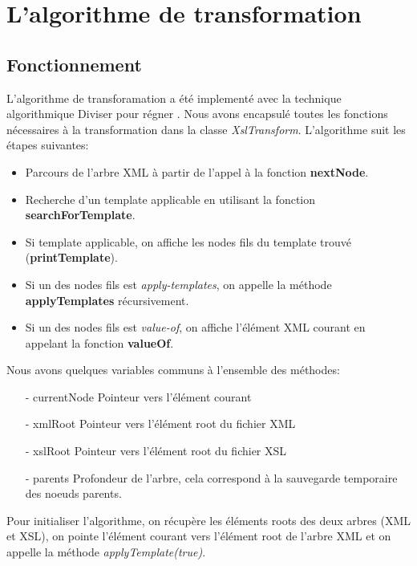 \section{L'algorithme de transformation}
	\subsection {Fonctionnement}
	L'algorithme de transforamation a été implementé avec la 
	technique algorithmique \og Diviser pour régner \fg. Nous avons
	encapsulé toutes les fonctions nécessaires à la transformation 
	dans la classe \textit {XslTransform}. 
	L'algorithme suit les étapes suivantes: \\

	\begin{itemize}
	\item Parcours de l'arbre XML à partir de l'appel à la fonction 
		\textbf{nextNode}.
	\item Recherche d'un template applicable en utilisant la fonction 
		\textbf{searchForTemplate}.
	\item Si template applicable, on affiche les nodes fils du 
		template trouvé (\textbf{printTemplate}).
	\item Si un des nodes fils est \textit{apply-templates}, on
		appelle la méthode \textbf{applyTemplates} récursivement.
	\item Si un des nodes fils est \textit{value-of}, on
		affiche l'élément XML courant en appelant la fonction
		\textbf{valueOf}. \\
	\end{itemize}	
	
	Nous avons quelques variables communs à l'ensemble des méthodes:
	
	\begin{itemize}
		\item[- currentNode] Pointeur vers l'élément courant
		\item[- xmlRoot] Pointeur vers l'élément root du fichier XML
		\item[- xslRoot] Pointeur vers l'élément root du fichier XSL
		\item[- parents] Profondeur de l'arbre, cela
		correspond à la sauvegarde temporaire des noeuds parents. \\
	\end{itemize}
	
	
	Pour initialiser l'algorithme, on récupère les éléments roots
	des deux arbres (XML et XSL), on pointe l'élément courant vers
	l'élément root de l'arbre XML et on appelle la méthode 
	\textit{applyTemplate(true)}.
